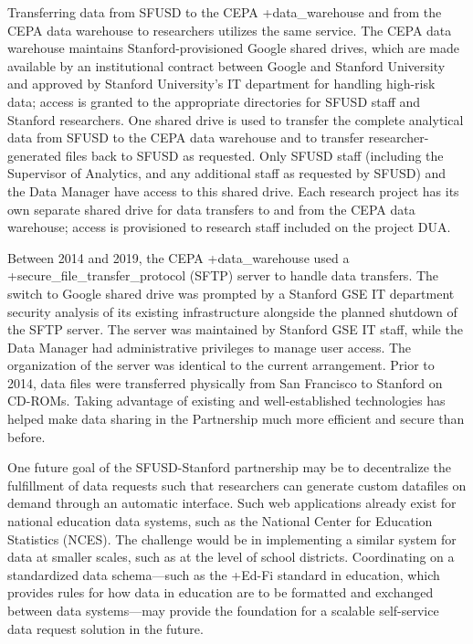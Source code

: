 \documentclass[
]{book}
\begin{document}
Transferring data from SFUSD to the CEPA +data\_warehouse\textbar{} and from the CEPA data warehouse to researchers utilizes the same service. The CEPA data warehouse maintains Stanford-provisioned Google shared drives, which are made available by an institutional contract between Google and Stanford University and approved by Stanford University's IT department for handling high-risk data; access is granted to the appropriate directories for SFUSD staff and Stanford researchers. One shared drive is used to transfer the complete analytical data from SFUSD to the CEPA data warehouse and to transfer researcher-generated files back to SFUSD as requested. Only SFUSD staff (including the Supervisor of Analytics, and any additional staff as requested by SFUSD) and the Data Manager have access to this shared drive. Each research project has its own separate shared drive for data transfers to and from the CEPA data warehouse; access is provisioned to research staff included on the project DUA.

Between 2014 and 2019, the CEPA +data\_warehouse\textbar{} used a +secure\_file\_transfer\_protocol\textbar{} (SFTP) server to handle data transfers. The switch to Google shared drive was prompted by a Stanford GSE IT department security analysis of its existing infrastructure alongside the planned shutdown of the SFTP server. The server was maintained by Stanford GSE IT staff, while the Data Manager had administrative privileges to manage user access. The organization of the server was identical to the current arrangement. Prior to 2014, data files were transferred physically from San Francisco to Stanford on CD-ROMs. Taking advantage of existing and well-established technologies has helped make data sharing in the Partnership much more efficient and secure than before.

One future goal of the SFUSD-Stanford partnership may be to decentralize the fulfillment of data requests such that researchers can generate custom datafiles on demand through an automatic interface. Such web applications already exist for national education data systems, such as the National Center for Education Statistics (NCES). The challenge would be in implementing a similar system for data at smaller scales, such as at the level of school districts. Coordinating on a standardized data schema---such as the +Ed-Fi\textbar{} standard in education, which provides rules for how data in education are to be formatted and exchanged between data systems---may provide the foundation for a scalable self-service data request solution in the future.
\end{document}
